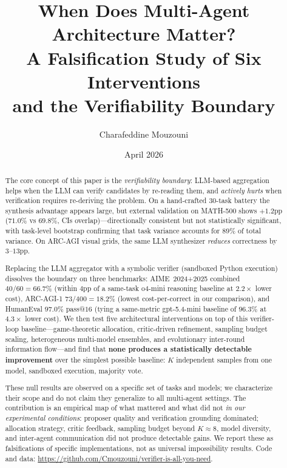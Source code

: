 \documentclass[11pt]{amsart}
\newcommand\1{{\mathds{1}}}
\theoremstyle{definition}
\theoremstyle{remark}
\numberwithin{equation}{section}
\begin{document}
\title[When Does Multi-Agent Architecture Matter?]
{When Does Multi-Agent Architecture Matter?\\[3pt]
A Falsification Study of Six Interventions\\[2pt]
and the Verifiability Boundary}

\author{Charafeddine Mouzouni}

\address{OPIT -- Open Institute of Technology, and Cohorte AI, Paris, France.}

\date{April 2026}

\begin{abstract}
The core concept of this paper is the \emph{verifiability boundary}: LLM-based aggregation helps when the LLM can verify candidates by re-reading them, and \emph{actively hurts} when verification requires re-deriving the problem.
On a hand-crafted $30$-task battery the synthesis advantage appears large, but external validation on MATH-500 shows $+1.2$pp ($71.0\%$ vs $69.8\%$, CIs overlap)---directionally consistent but not statistically significant, with task-level bootstrap confirming that task variance accounts for $89\%$ of total variance.
On ARC-AGI visual grids, the same LLM synthesizer \emph{reduces} correctness by $3$--$13$pp.

Replacing the LLM aggregator with a symbolic verifier (sandboxed Python execution) dissolves the boundary on three benchmarks: AIME~2024+2025 combined $40/60 = 66.7\%$ (within $4$pp of a same-task o4-mini reasoning baseline at $2.2\times$ lower cost), ARC-AGI-1 $73/400 = 18.2\%$ (lowest cost-per-correct in our comparison), and HumanEval $97.0\%$ pass@$16$ (tying a same-metric gpt-5.4-mini baseline of $96.3\%$ at $4.3\times$ lower cost).
We then test five architectural interventions on top of this verifier-loop baseline---game-theoretic allocation, critic-driven refinement, sampling budget scaling, heterogeneous multi-model ensembles, and evolutionary inter-round information flow---and find that \textbf{none produces a statistically detectable improvement} over the simplest possible baseline: $K$ independent samples from one model, sandboxed execution, majority vote.

These null results are observed on a specific set of tasks and models; we characterize their scope and do not claim they generalize to all multi-agent settings.
The contribution is an empirical map of what mattered and what did not \emph{in our experimental conditions}: proposer quality and verification grounding dominated; allocation strategy, critic feedback, sampling budget beyond $K\!\approx\!8$, model diversity, and inter-agent communication did not produce detectable gains.
We report these as falsifications of specific implementations, not as universal impossibility results.
Code and data: \url{https://github.com/Cmouzouni/verifier-is-all-you-need}.
\end{abstract}
\end{document}
